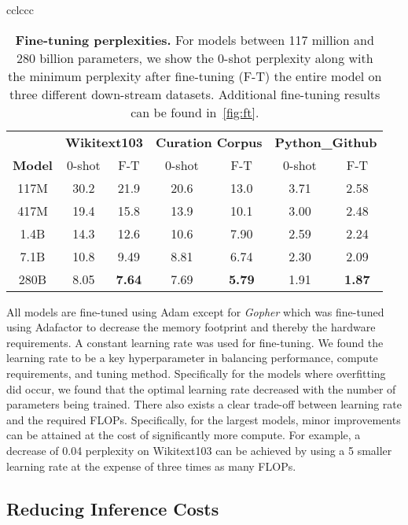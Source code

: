 \documentclass[11pt, a4paper, logo, internal, copyright, nonumbering]{deepmind}
\newcommand{\gopher}{\textit{Gopher}\xspace}
\begin{document}
\begin{center}
\begin{longtable}{cclccc}
{\begin{table*}[t]
    \centering
    \begin{tabular}{c|cc|cc|cc}
    \toprule
        \textbf{} & \multicolumn{2}{c}{\textbf{Wikitext103}} & \multicolumn{2}{c}{\textbf{Curation Corpus}} &
        \multicolumn{2}{c}{\textbf{Python\_Github}}\\
        \textbf{Model} & 0-shot & F-T& 0-shot & F-T & 0-shot & F-T \\        
        \midrule
         117M & 30.2 & 21.9 & 20.6 & 13.0 & 3.71 & 2.58\\
         417M & 19.4 & 15.8 & 13.9 & 10.1 & 3.00 & 2.48 \\
         1.4B & 14.3 & 12.6 & 10.6 & 7.90 & 2.59 & 2.24  \\
         7.1B   & 10.8 & 9.49  & 8.81  & 6.74 & 2.30 & 2.09  \\
         280B & 8.05  & \textbf{7.64}  & 7.69  & \textbf{5.79} & 1.91 & \textbf{1.87} \\
         \bottomrule
    \end{tabular}
    \caption{\textbf{Fine-tuning perplexities.} For models between 117 million and 280 billion parameters, we show the 0-shot perplexity along with the minimum perplexity after fine-tuning (F-T) the entire model on three different down-stream datasets.
    Additional fine-tuning results can be found in~\autoref{fig:ft}.}
    \label{tab:ft}
\end{table*}

All models are fine-tuned using Adam except for \gopher which was fine-tuned using Adafactor \citep{shazeer2018Adafactor} to decrease the memory footprint and thereby the hardware requirements.
A constant learning rate was used for fine-tuning.
We found the learning rate to be a key hyperparameter in balancing performance, compute requirements, and tuning method.
Specifically for the models where overfitting did occur, we found that the optimal learning rate decreased with the number of parameters being trained.
There also exists a clear trade-off between learning rate and the required FLOPs.
Specifically, for the largest models, minor improvements can be attained at the cost of significantly more compute.
For example, a decrease of 0.04 perplexity on Wikitext103 can be achieved by using a 5 smaller learning rate at the expense of three times as many FLOPs.

\subsection{Reducing Inference Costs}
\label{sec:reducinginference}
}
\end{longtable}
\end{center}
\end{document}
